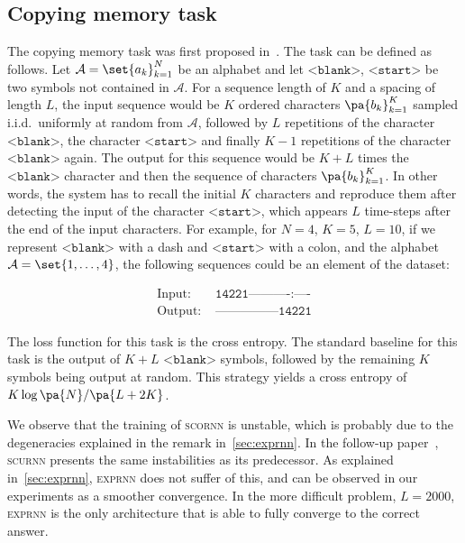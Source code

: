 \subsection{Copying memory task} The copying memory task was first proposed in~\cite{hochreiter1997long}. The task can be defined as follows. Let $\mathcal{A} = \set{a_k}_{k=1}^N$ be an alphabet and let $\texttt{<blank>}$, $\texttt{<start>}$ be two symbols not contained in $\mathcal{A}$. For a sequence length of $K$ and a spacing of length $L$, the input sequence would be $K$ ordered characters $\pa{b_k}_{k=1}^K$ sampled i.i.d.\ uniformly at random from $\mathcal{A}$, followed by $L$ repetitions of the character $\texttt{<blank>}$, the character $\texttt{<start>}$ and finally $K-1$ repetitions of the character $\texttt{<blank>}$ again. The output for this sequence would be $K+L$ times the $\texttt{<blank>}$ character and then the sequence of characters $\pa{b_k}_{k=1}^K$. In other words, the system has to recall the initial $K$ characters and reproduce them after detecting the input of the character $\texttt{<start>}$, which appears $L$ time-steps after the end of the input characters. For example, for $N = 4$, $K = 5$, $L = 10$, if we represent $\texttt{<blank>}$ with a dash and $\texttt{<start>}$ with a colon, and the alphabet $\mathcal{A} = \set{1, \dots, 4}$, the following sequences could be an element of the dataset:

\begin{align*}
    \text{Input:  }&\texttt{14221----------:----} \\
    \text{Output: }&\texttt{---------------14221}
\end{align*}

The loss function for this task is the cross entropy. The standard baseline for this task is the output of $K+L$ $\texttt{<blank>}$ symbols, followed by the remaining $K$ symbols being output at random. This strategy yields a cross entropy of $K\log\pa{N}/ \pa{L + 2K}$.

We observe that the training of \textsc{scornn} is unstable, which is probably due to the degeneracies explained in the remark in~\ref{sec:exprnn}.
In the follow-up paper~\cite{maduranga2018complexur}, \textsc{scurnn} presents the same instabilities as its predecessor. As explained in~\ref{sec:exprnn}, \textsc{exprnn} does not suffer of this, and can be observed in our experiments as a smoother convergence. In the more difficult problem, $L=2000$, \textsc{exprnn} is the only architecture that is able to fully converge to the correct answer.

